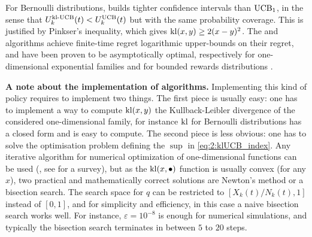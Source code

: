 For Bernoulli distributions, \klUCB{} builds tighter confidence intervals than $\mathrm{UCB}_1$, in the sense that $U_k^{\mathrm{kl}\text{-}\mathrm{UCB}}(t) < U_k^{\mathrm{UCB}}(t)$
but with the same probability coverage.
This is justified by Pinkser's inequality, which gives $\mathrm{kl}(x,y) \geq 2(x-y)^2$.
%
The \KLUCB{} and \klUCB{} algorithms achieve finite-time regret logarithmic upper-bounds on their regret, and have been proven to be asymptotically optimal, respectively for one-dimensional exponential families and for bounded rewards distributions \cite{Garivier11KL,KLUCBJournal}.


\textbf{A note about the implementation of \klUCB{} algorithms.}
%
Implementing this kind of policy requires to implement two things.
The first piece is usually easy: one has to implement a way to compute $\mathrm{kl}(x,y)$ the Kullback-Leibler divergence of the considered one-dimensional family,
for instance $\mathrm{kl}$ for Bernoulli distributions has a closed form and is easy to compute.
The second piece is less obvious: one has to solve the optimisation problem defining the $\sup$ in \eqref{eq:2:klUCB_index}.
Any iterative algorithm for numerical optimization of one-dimensional functions can be used (\eg, see \cite{BoydVanderberghe04} for a survey), but as the $\mathrm{kl}(x,\bullet)$ function is usually convex (for any $x$), two practical and mathematically correct solutions are Newton's method or a bisection search.
The search space for $q$ can be restricted to $[ X_k(t) / N_k(t), 1 ]$ instead of $[0,1]$,
and for simplicity and efficiency, in this case a naive bisection search works well.
For instance, $\varepsilon=10^{-8}$ is enough for numerical simulations, and typically the bisection search terminates in between $5$ to $20$ steps.

